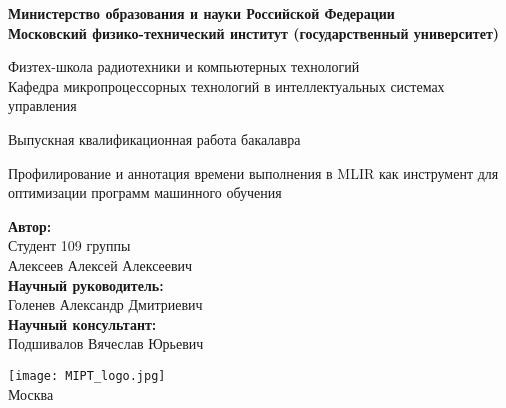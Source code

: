 \begin{center}
    \large\textbf{Министерство образования и науки Российской Федерации \\
    Московский физико-технический институт (государственный
    университет)} \\
    \vspace{1cm}

    Физтех-школа радиотехники и компьютерных технологий \\

    Кафедра микропроцессорных технологий в интеллектуальных системах управления \\

    \vspace{3em}

    Выпускная квалификационная работа бакалавра
\end{center}

\begin{center}
    \vspace{\fill}
    \LARGE{Профилирование и аннотация времени выполнения в MLIR как инструмент для оптимизации программ машинного обучения}

    \vspace{\fill}
\end{center}


\begin{flushright}
    \textbf{Автор:} \\
    Студент 109 группы \\
    Алексеев Алексей Алексеевич \\
    \vspace{2em}
    \textbf{Научный руководитель:} \\
    Голенев Александр Дмитриевич \\
    \vspace{2em}
    \textbf{Научный консультант:} \\
    Подшивалов Вячеслав Юрьевич \\
\end{flushright}

\vspace{7em}

\begin{center}
    \texttt{[image: MIPT\_logo.jpg]}\\
    Москва \the\year{}
\end{center}

\thispagestyle{empty}

\newpage
\setcounter{page}{2}
\fancyfoot[c]{\thepage}
\fancyhead[R]{}